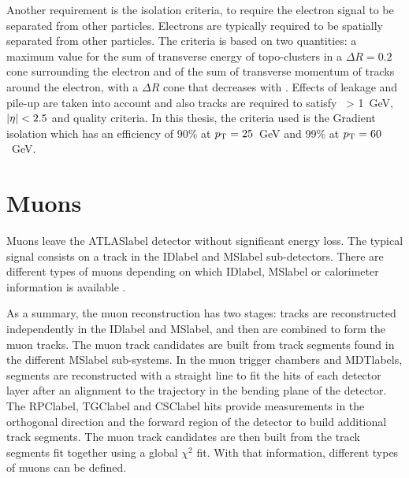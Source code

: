 Another requirement is the isolation criteria, to require the electron signal to be separated from other particles. Electrons are typically required to be spatially separated from other particles. The criteria is based on two quantities: a maximum value for the sum of transverse energy of topo-clusters in a $\Delta R=0.2$ cone surrounding the electron and of the sum of transverse momentum of tracks around the electron, with a $\Delta R$ cone that decreases with \pT. Effects of leakage and pile-up are taken into account and also tracks are required to satisfy \pT\ > 1~GeV, $\abs{\eta}<2.5$ and quality criteria. In this thesis, the criteria used is the Gradient isolation which has an efficiency of 90\% at $p_{\text{T}} = 25$~GeV and 99\% at $p_{\text{T}} = 60$~GeV.

\section{Muons}

Muons leave the \acrshort{ATLASlabel} detector without significant energy loss. The typical signal consists on a track in the \acrshort{IDlabel} and \acrshort{MSlabel} sub-detectors. There are different types of muons depending on which \acrshort{IDlabel}, \acrshort{MSlabel} or calorimeter information is available %
.

As a summary, the muon reconstruction has two stages: tracks are reconstructed independently in the \acrshort{IDlabel} and \acrshort{MSlabel}, and then are combined to form the muon tracks. The muon track candidates are built from track segments found in the different \acrshort{MSlabel} sub-systems. In the muon trigger chambers and \acrshort{MDTlabel}s, segments are reconstructed with a straight line to fit the hits of each detector layer after an alignment to the trajectory in the bending plane of the detector. The \acrshort{RPClabel}, \acrshort{TGClabel} and \acrshort{CSClabel} hits provide measurements in the orthogonal direction and the forward region of the detector to build additional track segments. The muon track candidates are then built from the track segments fit together using a global $\chi^2$ fit. With that information, different types of muons can be defined.

